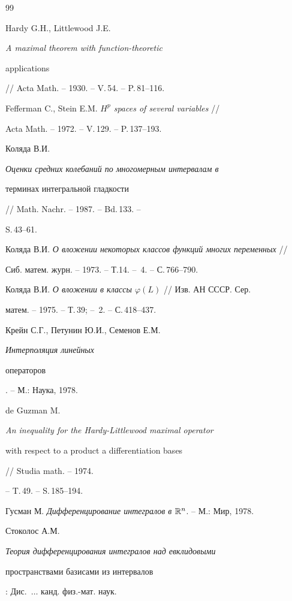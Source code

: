 \begin{thebibliography}{99} 


 




Hardy G.H., Littlewood J.E. {\em A maximal theorem with function-theoretic 


applications} // Acta Math. -- 1930. -- V.\,54. -- P.\,81--116. 




Fefferman C., Stein E.M. {\em $H^p$ spaces of several variables} // 


Acta Math. -- 1972. -- V.\,129. -- P.\,137--193. 




Коляда В.И. {\em Оценки средних колебаний по многомерным интервалам в 


терминах интегральной гладкости} // Math. Nachr. -- 1987. -- Bd.\,133. -- 


S.\,43--61. 




Коляда В.И. {\em О вложении некоторых классов функций многих переменных} // 


Сиб. матем. журн. -- 1973. -- Т.14. -- \No\,4. -- С.\,766--790. 




Коляда В.И. {\em О вложении в классы $\varphi(L)$} // Изв. АН СССР. Сер. 


матем. -- 1975. -- Т.\,39; -- \No\,2. -- С.\,418--437. 




Крейн С.Г., Петунин Ю.И., Семенов Е.М. {\em Интерполяция линейных 


операторов}. -- М.: Наука, 1978.




de Guzman M. {\em An inequality for the Hardy-Littlewood maximal operator 


with respect to a product a differentiation bases} // Studia math. -- 1974. 


-- T.\,49. -- S.\,185--194. 




Гусман М. {\em Дифференцирование интегралов в $\Bbb R^n$}. -- М.: Мир, 1978. 




Стоколос А.М. {\em Теория дифференцирования интегралов над евклидовыми 


пространствами базисами из интервалов}: Дис.~$\dotsc$ канд. физ.-мат. наук. 



\end{thebibliography}
